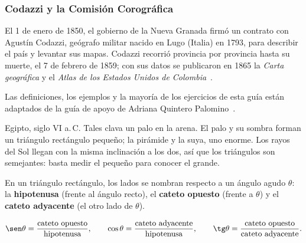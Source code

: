 \documentclass[11pt]{article}
\begin{document}
\subsubsection*{Codazzi y la Comisión Corográfica}

El 1 de enero de 1850, el gobierno de la Nueva Granada firmó un contrato con
Agustín Codazzi, geógrafo militar nacido en Lugo (Italia) en 1793, para
describir el país y levantar sus mapas. Codazzi recorrió provincia por
provincia hasta su muerte, el 7 de febrero de 1859; con sus datos se
publicaron en 1865 la \emph{Carta geográfica} y el \emph{Atlas de los Estados
Unidos de Colombia}~\cite{bnc}.

Las definiciones, los ejemplos y la mayoría de los ejercicios de esta guía
están adaptados de la guía de apoyo de Adriana Quintero Palomino~\cite{quintero}.

\label{tema:razones}

\begin{hilo}
Egipto, siglo VI a.\,C. Tales clava un palo en la arena. El palo y su sombra
forman un triángulo rectángulo pequeño; la pirámide y la suya, uno enorme. Los
rayos del Sol llegan con la misma inclinación a los dos, así que los triángulos
son semejantes: basta medir el pequeño para conocer el grande.
\end{hilo}

En un triángulo rectángulo, los lados se nombran respecto a un ángulo agudo
$\theta$: la \textbf{hipotenusa} (frente al ángulo recto), el \textbf{cateto
opuesto} (frente a $\theta$) y el \textbf{cateto adyacente} (el otro lado de
$\theta$).

\begin{center}
\end{center}

\begin{definicion}
\[
  \sen\theta = \frac{\text{cateto opuesto}}{\text{hipotenusa}}, \qquad
  \cos\theta = \frac{\text{cateto adyacente}}{\text{hipotenusa}}, \qquad
  \tg\theta = \frac{\text{cateto opuesto}}{\text{cateto adyacente}}.
\]
\end{definicion}
\end{document}
